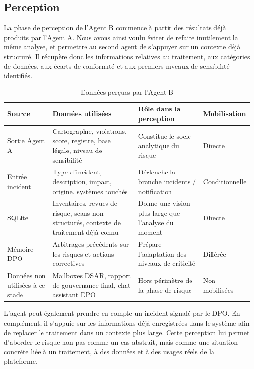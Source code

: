 \documentclass[12pt,a4paper]{report}
\begin{document}
\subsection{Perception}

La phase de perception de l'Agent B commence à partir des résultats déjà produits par l'Agent A. Nous avons ainsi voulu éviter de refaire inutilement la même analyse, et permettre au second agent de s'appuyer sur un contexte déjà structuré. Il récupère donc les informations relatives au traitement, aux catégories de données, aux écarts de conformité et aux premiers niveaux de sensibilité identifiés.

\begin{table}[H]
\centering
\caption{Données perçues par l'Agent B}
\label{tab:perception_agent_b}
\begin{tabularx}{\textwidth}{|p{3cm}|X|X|p{2.7cm}|}
\hline
\textbf{Source} & \textbf{Données utilisées} & \textbf{Rôle dans la perception} & \textbf{Mobilisation} \\
\hline
Sortie Agent A & Cartographie, violations, score, registre, base légale, niveau de sensibilité & Constitue le socle analytique du risque & Directe \\
\hline
Entrée incident & Type d'incident, description, impact, origine, systèmes touchés & Déclenche la branche incidents / notification & Conditionnelle \\
\hline
SQLite & Inventaires, revues de risque, scans non structurés, contexte de traitement déjà connu & Donne une vision plus large que l'analyse du moment & Directe \\
\hline
Mémoire DPO & Arbitrages précédents sur les risques et actions correctives & Prépare l'adaptation des niveaux de criticité & Différée \\
\hline
Données non utilisées à ce stade & Mailboxes DSAR, rapport de gouvernance final, chat assistant DPO & Hors périmètre de la phase de risque & Non mobilisées \\
\hline
\end{tabularx}
\end{table}

L'agent peut également prendre en compte un incident signalé par le DPO. En complément, il s'appuie sur les informations déjà enregistrées dans le système afin de replacer le traitement dans un contexte plus large. Cette perception lui permet d'aborder le risque non pas comme un cas abstrait, mais comme une situation concrète liée à un traitement, à des données et à des usages réels de la plateforme.
\end{document}

